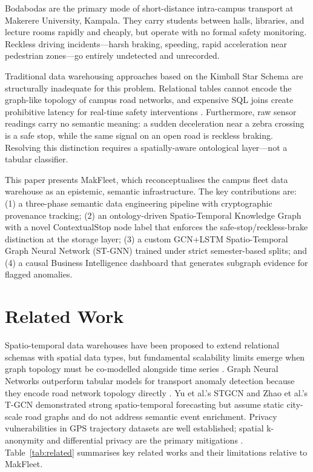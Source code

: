 \documentclass[conference]{IEEEtran}
\begin{document}
Bodabodas are the primary mode of short-distance intra-campus
transport at Makerere University, Kampala. They carry students
between halls, libraries, and lecture rooms rapidly and cheaply,
but operate with no formal safety monitoring. Reckless driving
incidents---harsh braking, speeding, rapid acceleration near
pedestrian zones---go entirely undetected and unrecorded.

Traditional data warehousing approaches based on the Kimball Star
Schema are structurally inadequate for this problem. Relational
tables cannot encode the graph-like topology of campus road
networks, and expensive SQL joins create prohibitive latency for
real-time safety interventions \cite{kimball2013}. Furthermore, raw
sensor readings carry no semantic meaning: a sudden deceleration
near a zebra crossing is a safe stop, while the same signal on an
open road is reckless braking. Resolving this distinction requires
a spatially-aware ontological layer---not a tabular classifier.

This paper presents MakFleet, which reconceptualises the campus
fleet data warehouse as an epistemic, semantic infrastructure.
The key contributions are: (1) a three-phase semantic data
engineering pipeline with cryptographic provenance tracking; (2) an
ontology-driven Spatio-Temporal Knowledge Graph with a novel
ContextualStop node label that enforces the safe-stop/reckless-brake
distinction at the storage layer; (3) a custom GCN+LSTM
Spatio-Temporal Graph Neural Network (ST-GNN) trained under strict
semester-based splits; and (4) a causal Business Intelligence
dashboard that generates subgraph evidence for flagged anomalies.


\section{Related Work}

Spatio-temporal data warehouses have been proposed to extend
relational schemas with spatial data types, but fundamental
scalability limits emerge when graph topology must be co-modelled
alongside time series \cite{pelekis2014}. Graph Neural Networks
outperform tabular models for transport anomaly detection because
they encode road network topology directly \cite{zhu2022}. Yu
et al.'s STGCN \cite{yu2018} and Zhao et al.'s T-GCN \cite{zhao2019}
demonstrated strong spatio-temporal forecasting but assume static
city-scale road graphs and do not address semantic event enrichment.
Privacy vulnerabilities in GPS trajectory datasets are well
established; spatial k-anonymity and differential privacy are the
primary mitigations \cite{demontjoye2013}. Table~\ref{tab:related}
summarises key related works and their limitations relative to
MakFleet.
\end{document}

